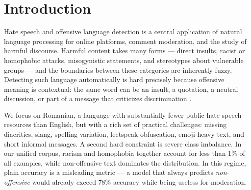 \section{Introduction}
\label{sec:introduction}

Hate speech and offensive language detection is a central application of natural language processing for online platforms, comment moderation, and the study of harmful discourse. Harmful content takes many forms --- direct insults, racist or homophobic attacks, misogynistic statements, and stereotypes about vulnerable groups --- and the boundaries between these categories are inherently fuzzy. Detecting such language automatically is hard precisely because offensive meaning is contextual: the same word can be an insult, a quotation, a neutral discussion, or part of a message that criticizes discrimination \citep{akhtar2021whose}.

We focus on Romanian, a language with substantially fewer public hate-speech resources than English, but with a rich set of practical challenges: missing diacritics, slang, spelling variation, leetspeak obfuscation, emoji-heavy text, and short informal messages. A second hard constraint is severe class imbalance. In our unified corpus, racism and homophobia together account for less than 1\% of all examples, while non-offensive text dominates the distribution. In this regime, plain accuracy is a misleading metric --- a model that always predicts \textit{non-offensive} would already exceed 78\% accuracy while being useless for moderation.

